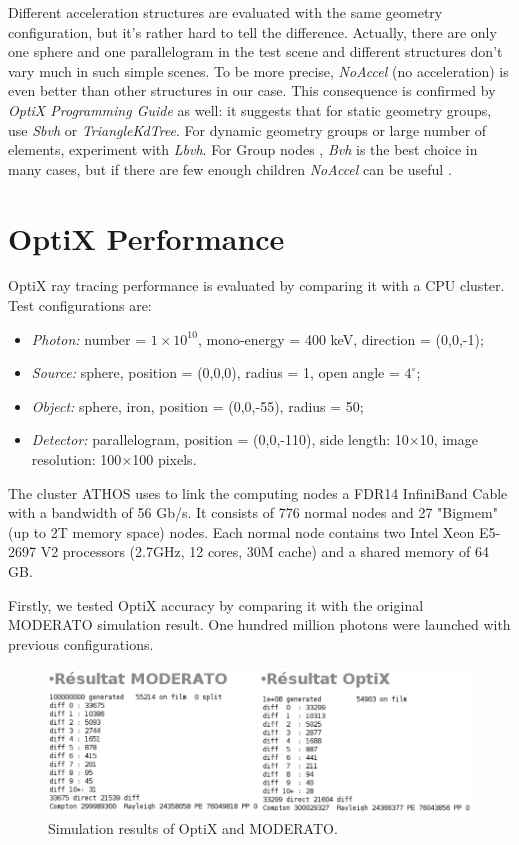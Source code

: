 Different acceleration structures are evaluated with the same geometry configuration, but it's rather hard to tell the difference. Actually, there are only one sphere and one parallelogram in the test scene and different structures don't vary much in such simple scenes. To be more precise, \textit{NoAccel} (no acceleration) is even better than other structures in our case. This consequence is confirmed by \textit{OptiX Programming Guide} as well: it suggests that for static geometry groups, use \textit{Sbvh} or \textit{TriangleKdTree}. For dynamic geometry groups or large number of elements, experiment with \textit{Lbvh}. For Group nodes , \textit{Bvh} is the best choice in many cases, but if there are few enough children \textit{NoAccel} can be useful \citep{Reference6}.


\section{OptiX Performance}
\label{optixperform}
OptiX ray tracing performance is evaluated by comparing it with a CPU cluster. Test configurations are:
\begin{itemize}
  \item \textit{Photon: }number = $1\times10^{10}$, mono-energy = 400 keV, direction = (0,0,-1); 
  \item \textit{Source: }sphere, position = (0,0,0), radius = 1, open angle = $4^{\circ}$;
  \item \textit{Object: }sphere, iron, position = (0,0,-55), radius = 50;
  \item \textit{Detector: }parallelogram, position = (0,0,-110), side length: 10$\times$10, image resolution: 100$\times$100 pixels.
\end{itemize}

The cluster ATHOS uses to link the computing nodes a FDR14 InfiniBand Cable with a bandwidth of 56 Gb/s. It consists of 776 normal nodes and 27 "Bigmem" (up to 2T memory space) nodes. Each normal node contains two Intel Xeon E5-2697 V2 processors (2.7GHz, 12 cores, 30M cache) and a shared memory of 64 GB. 

Firstly, we tested OptiX accuracy by comparing it with the original MODERATO simulation result. One hundred million photons were launched with previous configurations.
\begin{figure}[htbp]
	\centering
		\includegraphics[width=\textwidth]{Figures/test.png}
	\caption{Simulation results of OptiX and MODERATO.}
	\label{fig:test}
\end{figure}

